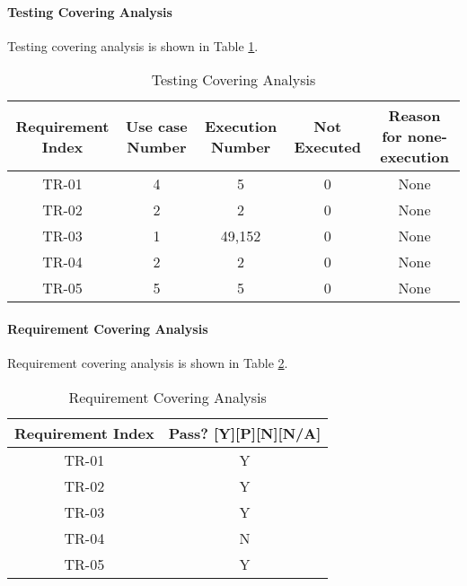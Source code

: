 \documentclass[10pt]{article}
\begin{document}
\paragraph{Testing Covering Analysis}
Testing covering analysis is shown in Table \ref{Testing Covering Analysis}.

\begin{table}[htb]
	\centering
	\begin{tabular}{|c|c|c|c|c|}
	\hline
	Requirement Index & Use case Number & Execution Number & Not Executed & Reason for none-execution \\ \hline
	TR-01             & 4               & 5                & 0            & None                      \\ \hline
	TR-02             & 2               & 2                & 0            & None                      \\ \hline
	TR-03             & 1               & 49,152           & 0            & None                      \\ \hline
	TR-04             & 2               & 2                & 0            & None                      \\ \hline
	TR-05             & 5               & 5                & 0            & None                      \\ \hline
	\end{tabular}
	\caption{Testing Covering Analysis}
	\label{Testing Covering Analysis}
	\end{table}

\paragraph{Requirement Covering Analysis}
Requirement covering analysis is shown in Table \ref{Requirement Covering Analysis}.

\begin{table}[htb]
	\centering
	\begin{tabular}{|c|c|}
	\hline
	Requirement Index & Pass? {[}Y{]}{[}P{]}{[}N{]}{[}N/A{]} \\ \hline
	TR-01             & Y                                    \\ \hline
	TR-02             & Y                                    \\ \hline
	TR-03             & Y                                    \\ \hline
	TR-04             & N                                    \\ \hline
	TR-05             & Y                                    \\ \hline
	\end{tabular}

	\caption{Requirement Covering Analysis}
	\label{Requirement Covering Analysis}
	\end{table}
\end{document}

